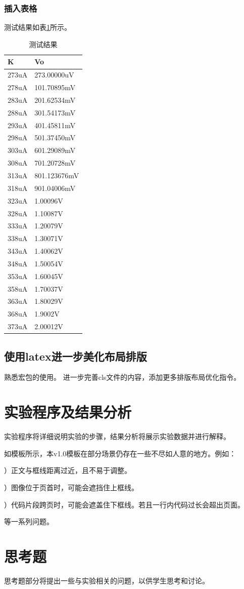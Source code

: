 \documentclass{cquptformat}
\begin{document}
\newpage

\subsubsection{插入表格}
测试结果如表\ref{tab:测试}所示。


\begin{table}[H]
	\centering
	\caption{测试结果}
	\begin{tabularx}{0.6\linewidth}{>{\centering\arraybackslash}X >{\centering\arraybackslash}X} %
		\toprule[1.5pt]
		K     & Vo \\
		\midrule
		273uA & 273.00000uV \\
		278uA & 101.70895mV \\
		283uA & 201.62534mV \\
		288uA & 301.54173mV \\
		293uA & 401.45811mV \\
		298uA & 501.37450mV \\
		303uA & 601.29089mV \\
		308uA & 701.20728mV \\
		313uA & 801.123676mV \\
		318uA & 901.04006mV \\
		323uA & 1.00096V \\
		328uA & 1.10087V \\
		333uA & 1.20079V \\
		338uA & 1.30071V \\
		343uA & 1.40062V \\
		348uA & 1.50054V \\
		353uA & 1.60045V \\
		358uA & 1.70037V \\
		363uA & 1.80029V \\
		368uA & 1.9002V \\
		373uA & 2.00012V \\
		\bottomrule[1.5pt]
	\end{tabularx}%
	\label{tab:测试}%
\end{table}

\subsection{使用latex进一步美化布局排版}

熟悉宏包的使用。
进一步完善cls文件的内容，添加更多排版布局优化指令。

\section{实验程序及结果分析}

实验程序将详细说明实验的步骤，结果分析将展示实验数据并进行解释。

如模板所示，本v1.0模板在部分场景仍存在一些不尽如人意的地方。例如：

）正文与框线距离过近，且不易于调整。	
						
）图像位于页首时，可能会遮挡住上框线。

）代码片段跨页时，可能会遮盖住下框线。若且一行内代码过长会超出页面。

等一系列问题。

\section{思考题}
思考题部分将提出一些与实验相关的问题，以供学生思考和讨论。


	
\end{document}
